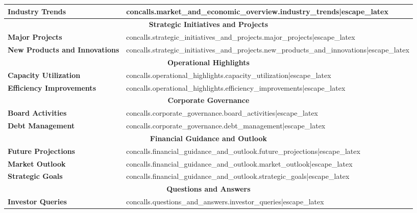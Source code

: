 \documentclass{article}
\begin{document}
\begin{table}[H]
\begin{tabularx}{\textwidth}{|m{5cm}|>{\raggedright\arraybackslash}X|}
            \hline
            \textbf{Industry Trends} & {{ concalls.market_and_economic_overview.industry_trends|escape_latex }} \\
            \hline
            \multicolumn{2}{|c|}{\textbf{Strategic Initiatives and Projects}} \\
            \hline
            \textbf{Major Projects} & {{ concalls.strategic_initiatives_and_projects.major_projects|escape_latex }} \\
            \hline
            \textbf{New Products and Innovations} & {{ concalls.strategic_initiatives_and_projects.new_products_and_innovations|escape_latex }} \\
            \hline
            \multicolumn{2}{|c|}{\textbf{Operational Highlights}} \\
            \hline
            \textbf{Capacity Utilization} & {{ concalls.operational_highlights.capacity_utilization|escape_latex }} \\
            \hline
            \textbf{Efficiency Improvements} & {{ concalls.operational_highlights.efficiency_improvements|escape_latex }} \\
            \hline
            \multicolumn{2}{|c|}{\textbf{Corporate Governance}} \\
            \hline
            \textbf{Board Activities} & {{ concalls.corporate_governance.board_activities|escape_latex }} \\
            \hline
            \textbf{Debt Management} & {{ concalls.corporate_governance.debt_management|escape_latex }} \\
            \hline
            \multicolumn{2}{|c|}{\textbf{Financial Guidance and Outlook}} \\
            \hline
            \textbf{Future Projections} & {{ concalls.financial_guidance_and_outlook.future_projections|escape_latex }} \\
            \hline
            \textbf{Market Outlook} & {{ concalls.financial_guidance_and_outlook.market_outlook|escape_latex }} \\
            \hline
            \textbf{Strategic Goals} & {{ concalls.financial_guidance_and_outlook.strategic_goals|escape_latex }} \\
            \hline
            \multicolumn{2}{|c|}{\textbf{Questions and Answers}} \\
            \hline
            \textbf{Investor Queries} & {{ concalls.questions_and_answers.investor_queries|escape_latex }} \\

\end{tabularx}
\end{table}
\end{document}
